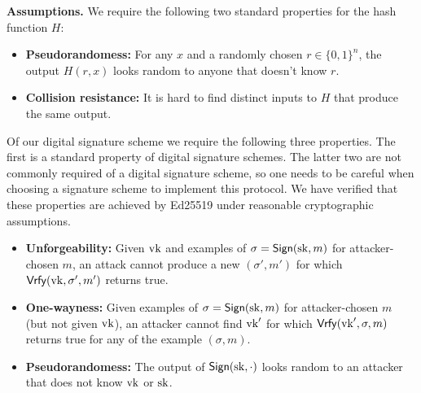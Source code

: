 \documentclass{article}
\begin{document}
{\bf Assumptions.} We require the following two standard properties for the hash function $H$:
\begin{itemize}
	\item \textbf{Pseudorandomess:} For any $x$ and a randomly chosen $r\in\{0,1\}^n$, the output $H(r,x)$ looks random to anyone that doesn't know $r$.
	\item \textbf{Collision resistance:} It is hard to find distinct inputs to $H$ that produce the same output.
\end{itemize}
Of our digital signature scheme we require the following three properties. The first is a standard property of digital signature schemes. The latter two are not commonly required of a digital signature scheme, so one needs to be careful when choosing a signature scheme to implement this protocol. We have verified that these properties are achieved by Ed25519 under reasonable cryptographic assumptions. 
\begin{itemize}
	\item \textbf{Unforgeability:} Given $\mathrm{vk}$ and examples of $\sigma=\mathsf{Sign}(\mathrm{sk},m)$ for attacker-chosen $m$, an attack cannot produce a new $(\sigma',m')$ for which $\mathsf{Vrfy}(\mathrm{vk}, \sigma', m')$ returns true.
	\item \textbf{One-wayness:}	Given examples of $\sigma=\mathsf{Sign}(\mathrm{sk},m)$ for attacker-chosen $m$ (but not given $\mathrm{vk}$), an attacker cannot find $\mathrm{vk}'$ for which $\mathsf{Vrfy}(\mathrm{vk}', \sigma, m )$ returns true for any of the example $(\sigma,m)$.
	\item \textbf{Pseudorandomess:} The output of $\mathsf{Sign}(\mathrm{sk},\cdot)$ looks random to an attacker that does not know $\mathrm{vk}$ or $\mathrm{sk}$.
\end{itemize}
\end{document}
